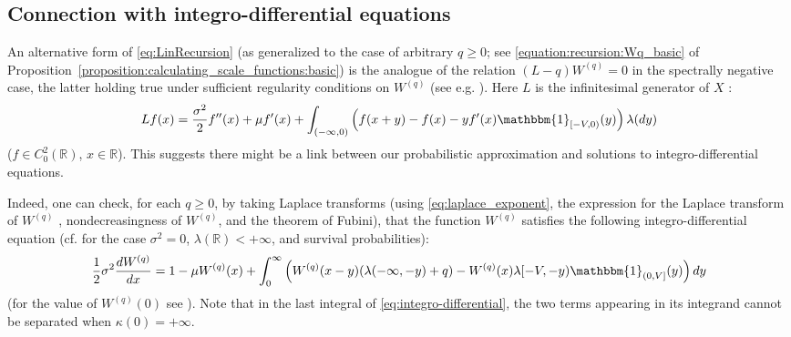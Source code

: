 \documentclass[pdftex,oneside,11pt,reqno]{amsart}
\theoremstyle{definition}
\theoremstyle{theorem}
\theoremstyle{remark}
\numberwithin{equation}{section}
\numberwithin{definition}{section}
\begin{document}
\subsection{Connection with integro-differential equations}\label{subsection:connection_to_IDE}
An alternative form of \eqref{eq:LinRecursion} (as generalized to the case of arbitrary $q\geq 0$; see \eqref{equation:recursion:Wq_basic} of Proposition~\ref{proposition:calculating_scale_functions:basic}) is the analogue of the relation $(L-q){W^{(q)}}=0$ in the spectrally negative case, the latter holding true under sufficient regularity conditions on ${W^{(q)}}$ (see e.g. \cite[Eq.~(12)]{biffis}). Here $L$ is the infinitesimal generator of $X$ \cite[p. 208, Theorem 31.5]{sato}: $$Lf(x)=\frac{\sigma^2}{2}f''(x)+\mu f'(x)+\int_{(-\infty,0)}\left(f(x+y)-f(x)-yf'(x)\mathbbm{1}_{[-V,0)}(y)\right){\lambda}(dy)$$ ($f\in C^2_0(\mathbb{R})$, $x\in \mathbb{R}$). This suggests there might be a link between our probabilistic approximation and solutions to integro-differential equations. 

Indeed, one can check, for each $q\geq 0$, by taking Laplace transforms (using \eqref{eq:laplace_exponent}, the expression for the Laplace transform of ${W^{(q)}}$ \cite[p. 100, Eq.~(4)]{kuznetsovkyprianourivero}, nondecreasingness of ${W^{(q)}}$, and the theorem of Fubini), that the function ${W^{(q)}}$ satisfies the following integro-differential equation (cf. \cite[Corollary IV.3.3]{asmussen} for the case ${\sigma^2}=0$, ${\lambda}(\mathbb{R})<+\infty$, and survival probabilities): 
\footnotesize
\begin{equation}\label{eq:integro-differential}
\frac{1}{2}{\sigma^2} \frac{d{W^{(q)}}}{dx}=1-\mu{W^{(q)}}(x)+\int_0^\infty\left({W^{(q)}}(x-y)({\lambda}(-\infty,-y)+q)-{W^{(q)}}(x){\lambda}[-V,-y)\mathbbm{1}_{(0,V]}(y)\right)dy
\end{equation}
\normalsize
(for the value of ${W^{(q)}}(0)$ see \cite[p. 127, Lemma 3.1]{kuznetsovkyprianourivero}). Note that in the last integral of \eqref{eq:integro-differential}, the two terms appearing in its integrand cannot be separated when $\kappa(0)=+\infty$. 
\end{document}
